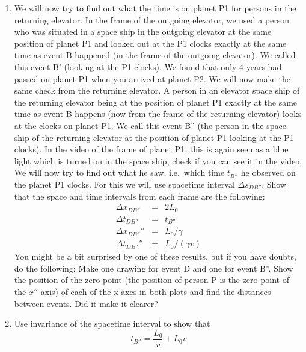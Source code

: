 {\begin{multicols}{2}
\begin{enumerate}
\[
\frac{L_0^2}{v^2}-L_0^2=(t_B'')^2,
\]
which gives $t_B''=L_0/(v\gamma)$, exactly as we thought. Now check the result comparing the videos of the frame of the outgoing (yellow) space ship and the incoming (red) space ship: when both of you meet at planet P2, what is the time in each of the space ships? Your clocks should agree at event B. Reassuring to see that our intiution still gives som reasonable results every now and then.
\item We will now try to find out what the time is on planet P1 for persons in the returning elevator. In the frame of the outgoing elevator, we used a person who was situated in a space ship in the outgoing elevator at the same position of planet P1 and looked out at the P1 clocks exactly at the same time as event B happened (in the frame of the outgoing elevator). We called this event B' (looking at the P1 clocks). We found that only $4$ years had passed on planet P1 when you arrived at planet P2. We will now make the same check from the returning elevator. A person in an elevator space ship of the returning elevator being at the position of planet P1 exactly at the same time as event B happens (now from the frame of the returning elevator) looks at the clocks on planet P1. We call this event B'' (the person in the space ship of the returning elevator at the position of planet P1 looking at the P1 clocks). In the video of the frame of planet P1, this is again seen as a blue light which is turned on in the space ship, check if you can see it in the video. We will now try to find out what he saw, i.e.\ which time $t_{B''}$ he observed on the planet P1 clocks. For this we will use spacetime interval $\Delta s_{DB''}$. Show that the space and time intervals from each frame are the following:
\begin{eqnarray*}
\Delta x_{DB''}&=&2L_0\\
\Delta t_{DB''}&=&t_{B''}\\
\Delta x_{DB''}''&=&L_0/\gamma\\
\Delta t_{DB''}''&=&L_0/(\gamma v)
\end{eqnarray*}
You might be a bit surprised by one of these results, but if you have doubts, do the following: Make one drawing for event D and one for event B''. Show the position of the zero-point (the position of person P is the zero point of the $x''$ axis) of each of the x-axes in both plots and find the distances between events. Did it make it clearer?
\item Use invariance of the spacetime interval to show that 
\[
t_{B''}=\frac{L_0}{v}+L_0v
\]
\end{enumerate}
\end{multicols}}
